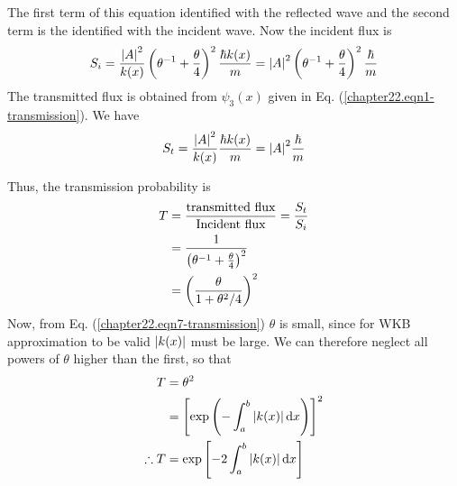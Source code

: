 The first term of this equation identified with the reflected wave and  the second term is the identified with the incident wave. Now the incident flux is
\begin{equation}
\label{chapter22.eqn10-transmission}
S_i = \frac{\abs{A}^2}{k(x)} \left(\theta^{-1} + \frac{\theta}{4}\right)^2 \frac{\hbar k(x)}{m} = \abs{A}^2 \left(\theta^{-1} + \frac{\theta}{4}\right)^2 \frac{\hbar}{m}
\end{equation}
The transmitted flux is obtained from $\psi_3(x)$ given in Eq. (\ref{chapter22.eqn1-transmission}). We have
\begin{equation}
\label{chapter22.eqn11-transmission}
S_t  = \frac{\abs{A}^2}{k(x)} \frac{\hbar k(x)}{m} = \abs{A}^2 \frac{\hbar}{m}
\end{equation}

Thus, the transmission probability is
\begin{align}
\label{chapter22.eqn12-transmission}
T &= \frac{\text{transmitted flux}}{\text{Incident flux}} = \frac{S_t}{S_i} \nonumber \\
 &= \frac{1}{\left(\theta^{-1} + \frac{\theta}{4}\right)^2} \nonumber \\
 &= \qty(\frac{\theta}{1 + \theta^2/4})^2
\end{align}
Now, from Eq. (\ref{chapter22.eqn7-transmission})
 $\theta$ is small, since for WKB approximation to be valid $\abs{k(x)}$ must be large. We can therefore neglect all powers of $\theta$ higher than the first, so that
 \begin{align}
 \label{chapter22.eqn13-transmission}
	 T &= \theta^2 \nonumber \\
	 &= \left[\exp\left(-\int_{a}^{b} \abs{k(x)} \dd{x}\right)\right]^2 \nonumber\\
\therefore T	 &= \exp\qty[-2\int_{a}^{b} \abs{k(x)} \dd{x}]
 \end{align}


